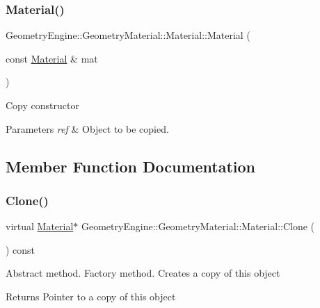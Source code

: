 \subsubsection{\texorpdfstring{Material()}{Material()}\hspace{0.1cm}{\footnotesize\ttfamily [2/2]}}
{\footnotesize\ttfamily Geometry\+Engine\+::\+Geometry\+Material\+::\+Material\+::\+Material (\begin{DoxyParamCaption}\item[{const \mbox{\hyperlink{class_geometry_engine_1_1_geometry_material_1_1_material}{Material}} \&}]{mat }\end{DoxyParamCaption})}

Copy constructor 
\begin{DoxyParams}{Parameters}
{\em ref} & Object to be copied. \\
\hline
\end{DoxyParams}


\subsection{Member Function Documentation}
\mbox{\label{class_geometry_engine_1_1_geometry_material_1_1_material_ae5513ff06d536365e18ddc5e07e79784}} 
\subsubsection{\texorpdfstring{Clone()}{Clone()}}
{\footnotesize\ttfamily virtual \mbox{\hyperlink{class_geometry_engine_1_1_geometry_material_1_1_material}{Material}}$\ast$ Geometry\+Engine\+::\+Geometry\+Material\+::\+Material\+::\+Clone (\begin{DoxyParamCaption}{ }\end{DoxyParamCaption}) const\hspace{0.3cm}{\ttfamily [pure virtual]}}

Abstract method. Factory method. Creates a copy of this object \begin{DoxyReturn}{Returns}
Pointer to a copy of this object 
\end{DoxyReturn}


